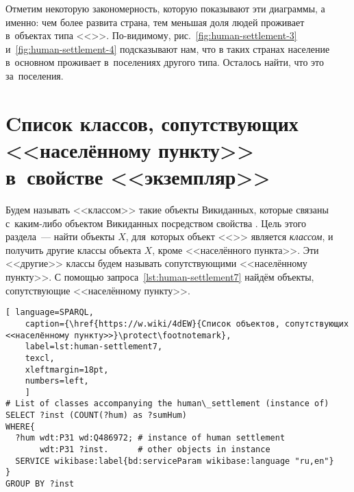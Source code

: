 Отметим некоторую закономерность, которую показывают эти диаграммы, а именно: 
чем более развита страна, тем меньшая доля людей проживает в~объектах типа 
<<>>. 
По-видимому, рис.~\ref{fig:human-settlement-3} и~\ref{fig:human-settlement-4} 
подсказывают нам, что в таких странах население в~основном проживает 
в~поселениях другого типа. Осталось найти, что это за~поселения. 





\section[Cписок классов, сопутствующих <<населённому пункту>> в~свойстве <<экземпляр>>]{Cписок классов, сопутствующих <<населённому пункту>>\\в~свойстве <<экземпляр>>}
\label{human-settlement:tag1}

Будем называть <<классом>> такие объекты Викиданных, 
которые связаны с~каким-либо объектом Викиданных посредством свойства . 
Цель этого раздела~--- найти объекты $X$, 
для~которых объект <<>> является \emph{классом}, 
и получить другие классы объекта $X$, кроме <<населённого пункта>>. 
Эти <<другие>> классы будем называть сопутствующими <<населённому пункту>>. 
С помощью запроса~\ref{lst:human-settlement7} 
найдём объекты, сопутствующие <<населённому пункту>>. 



\begin{lstlisting}[ language=SPARQL, 
    caption={\href{https://w.wiki/4dEW}{Cписок объектов, сопутствующих <<населённому пункту>>}\protect\footnotemark},
    label=lst:human-settlement7,
    texcl,
    xleftmargin=18pt, 
    numbers=left,
    ]
# List of classes accompanying the human\_settlement (instance of)
SELECT ?inst (COUNT(?hum) as ?sumHum) 
WHERE{          
  ?hum wdt:P31 wd:Q486972; # instance of human settlement
       wdt:P31 ?inst.      # other objects in instance
  SERVICE wikibase:label{bd:serviceParam wikibase:language "ru,en"}
}  
GROUP BY ?inst
\end{lstlisting}%

